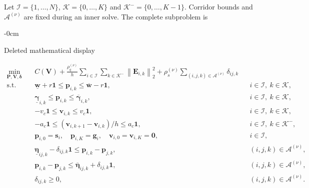 \documentclass[electronics,article,submit,moreauthors]{Definitions/mdpi}
\newcommand{\norm}[1]{\left\lVert #1\right\rVert}
\newcommand{\bp}{\mathbf{p}}
\newcommand{\bv}{\mathbf{v}}
\newcommand{\one}{\mathbf{1}}
\providecommand{\DIFdelbegin}{}\providecommand{\DIFdelend}{} %
\begin{document}
Let $\mathcal I=\{1,\ldots,N\}$, $\mathcal K=\{0,\ldots,K\}$ and $\mathcal K^-=\{0,\ldots,K-1\}$. Corridor bounds and $\mathcal A^{(\nu)}$ are fixed during an inner solve. The complete subproblem is
\begin{adjustwidth}{-\extralength}{0cm}

\DIFdelbegin 

\begin{mdframed}[nobreak=true,linecolor=RevisionRed,linewidth=.65pt,innerleftmargin=5pt,innerrightmargin=5pt,innertopmargin=2pt,innerbottommargin=2pt,skipabove=6pt,skipbelow=6pt]
\color{RevisionRed}
{\scriptsize Deleted mathematical display}\par
\begin{align*}
 \min_{\mathbf P,\mathbf V,\boldsymbol\delta}\quad&
 C(\mathbf V)
 +\frac{\rho_q^{(\nu)}}h\sum_{i\in\mathcal I}\sum_{k\in\mathcal K^-}\norm{\mathbf E_{i,k}}_2^2
 +\rho_s^{(\nu)}\sum_{(i,j,k)\in\mathcal A^{(\nu)}}\delta_{ij,k}
 \\
 \mathrm{s.t.}\quad&
 \underline{\mathbf w}+r\one\leq\bp_{i,k}\leq\overline{\mathbf w}-r\one,
 && i\in\mathcal I,\ k\in\mathcal K,\\
 &\underline{\boldsymbol\gamma}_{i,k}\leq\bp_{i,k}\leq\overline{\boldsymbol\gamma}_{i,k},
 &&i\in\mathcal I,\ k\in\mathcal K,\\
 &-v_c\one\leq\bv_{i,k}\leq v_c\one,
 &&i\in\mathcal I,\ k\in\mathcal K,\\
 &-a_c\one\leq(\bv_{i,k+1}-\bv_{i,k})/h\leq a_c\one,
 &&i\in\mathcal I,\ k\in\mathcal K^-,\\
 &\bp_{i,0}=\mathbf s_i,\quad\bp_{i,K}=\mathbf g_i,\quad
 \bv_{i,0}=\bv_{i,K}=\mathbf0,
 &&i\in\mathcal I,\\
 &\underline{\boldsymbol\eta}_{ij,k}-\delta_{ij,k}\one
 \leq\bp_{i,k}-\bp_{j,k},
 &&(i,j,k)\in\mathcal A^{(\nu)},\\
 &\bp_{i,k}-\bp_{j,k}\leq\overline{\boldsymbol\eta}_{ij,k}+\delta_{ij,k}\one,
 &&(i,j,k)\in\mathcal A^{(\nu)},\\
 &\delta_{ij,k}\geq0,
 &&(i,j,k)\in\mathcal A^{(\nu)}.
\end{align*}
\end{mdframed}



\end{adjustwidth}
\end{document}

